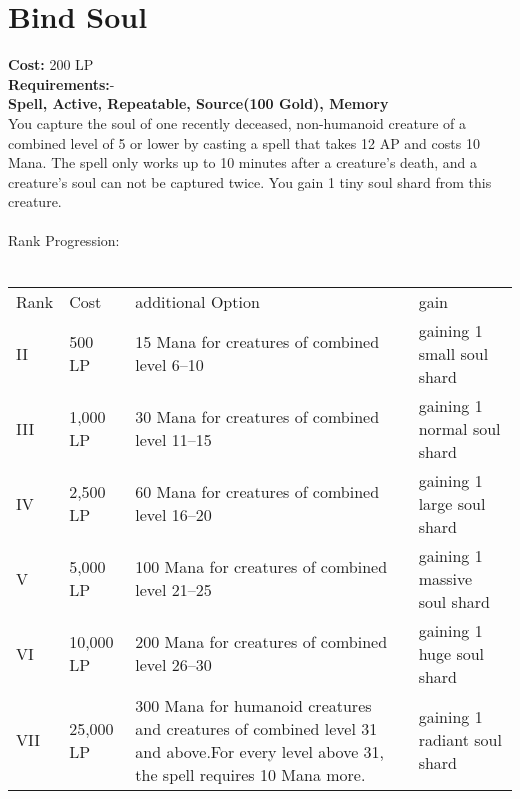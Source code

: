 \section{Bind Soul}\label{spell:bindSoul}
\textbf{Cost:} 200 LP\\
\textbf{Requirements:}-\\
\textbf{Spell, Active, Repeatable, Source(100 Gold), Memory}\\
You capture the soul of one recently deceased, non-humanoid creature of a combined level of 5 or lower by casting a spell that takes 12 AP and costs 10 Mana.
The spell only works up to 10 minutes after a creature's death, and a creature's soul can not be captured twice.
You gain 1 tiny soul shard from this creature.\\
\\
Rank Progression:\\
\\
\begin{tabular}{l | l | p{5.5cm} | p{2.5cm}}
    Rank & Cost & additional Option & gain\\
    II & 500 LP & 15 Mana for creatures of combined level 6--10 & gaining 1 small soul shard\\
    III & 1,000 LP & 30 Mana for creatures of combined level 11--15 & gaining 1 normal soul shard\\
    IV & 2,500 LP & 60 Mana for creatures of combined level 16--20 & gaining 1 large soul shard\\
    V & 5,000 LP & 100 Mana for creatures of combined level 21--25 & gaining 1 massive soul shard\\
    VI & 10,000 LP & 200 Mana for creatures of combined level 26--30 & gaining 1 huge soul shard\\
    VII & 25,000 LP & 300 Mana for humanoid creatures and creatures of combined level 31 and above.\linebreak For every level above 31, the spell requires 10 Mana more. & gaining 1 radiant soul shard\\
\end{tabular}